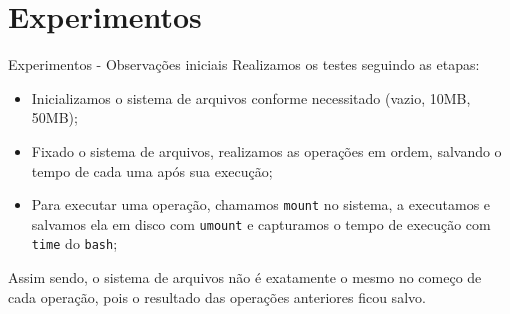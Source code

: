 \documentclass[10pt]{beamer}
\begin{document}
    \section{Experimentos}
    \begin{frame}{Experimentos - Observações iniciais}
        Realizamos os testes seguindo as etapas:
        \begin{itemize}
            \justifying
            \item Inicializamos o sistema de arquivos conforme necessitado
                (vazio, 10MB, 50MB);
            \item Fixado o sistema de arquivos, realizamos as operações em
                ordem, salvando o tempo de cada uma após sua execução;
            \item Para executar uma operação, chamamos \texttt{mount} no
                sistema, a executamos e salvamos ela em disco com
                \texttt{umount} e capturamos o tempo de execução com
                \texttt{time} do \texttt{bash};
        \end{itemize}
        Assim sendo, o sistema de arquivos não é exatamente o mesmo no começo de
        cada operação, pois o resultado das operações anteriores ficou salvo.
    \end{frame}
\end{document}
